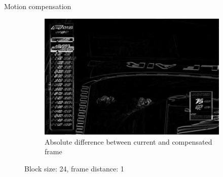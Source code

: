 \documentclass[aspectratio=1610,xcolor=dvipsnames]{beamer}
\begin{document}
\begin{frame}{Motion compensation}
\begin{figure}[htbp]
\begin{subfigure}[b]{0.3\textwidth}
            \includegraphics[width=.9\textwidth]{images/race-curr_comp_diff.png}
            \caption{Absolute difference between current and compensated frame}
            \label{fig:race-diff-curr-comp}
        \end{subfigure}
    
        \caption{Block size: 24, frame distance: 1}
    \end{figure}
\end{frame}
\end{document}
